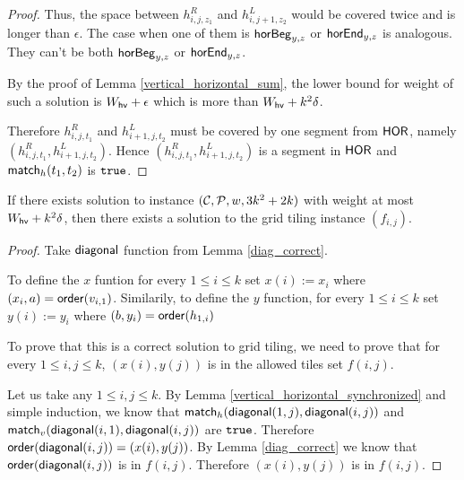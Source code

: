 \begin{proof}
Thus, the space between $h^R_{i,j,z_1}$ and $h^L_{i,j+1,z_2}$
would be covered twice and is longer than $\epsilon$.
The case when one of them is $\mathsf{horBeg}_{y,z}$ or $\mathsf{horEnd}_{y,z}$ is analogous.
They can't be both $\mathsf{horBeg}_{y,z}$ or $\mathsf{horEnd}_{y,z}$.

By the proof of Lemma \ref{vertical_horizontal_sum},
the lower bound for weight of such a solution is $W_{\mathsf{hv}} + \epsilon$
which is more than $W_{\mathsf{hv}}+k^2\delta$.

Therefore $h^R_{i,j,t_1}$ and $h^L_{i+1,j,t_2}$ must be covered
by one segment from $\mathsf{HOR}$, namely $(h^R_{i,j,t_1}, h^L_{i+1,j,t_2})$.
Hence $(h^R_{i,j,t_1}, h^L_{i+1,j,t_2})$ is a segment in $\mathsf{HOR}$
and $\mathsf{match}_h(t_1,t_2)$ is $\texttt{true}$.
\end{proof}


\begin{lemma}
\label{grid_tiling_exists}
	If there exists solution to instance $(\mathcal{C}, \mathcal{P}, w, 3k^2+2k)$
	with weight at most $W_{\mathsf{hv}}+k^2\delta$,
	then there exists a solution to the grid tiling instance $(f_{i,j})$.
\end{lemma}

\begin{proof}
Take $\mathsf{diagonal}$ function from Lemma \ref{diag_correct}.

To define the $x$ funtion 
for every $1 \le i \le k$ set $x(i) := x_i$
where $(x_i, a) = \mathsf{order}(v_{i,1})$.
Similarily, to define the $y$ function,
for every $1 \le i \le k$ set $y(i) := y_i$
where $(b, y_i) = \mathsf{order}(h_{1,i})$

To prove that this is a correct solution to grid tiling,
we need to prove that 
for every $1 \le i,j \le k$, $(x(i), y(j))$ is in
the allowed tiles set $f(i,j)$.

Let us take any $1 \le i,j \le k$.
By Lemma \ref{vertical_horizontal_synchronized}
and simple induction,
we know that $\mathsf{match}_h(\mathsf{diagonal}(1, j),\mathsf{diagonal}(i, j))$ and
$\mathsf{match}_v(\mathsf{diagonal}(i, 1),\mathsf{diagonal}(i, j))$ are $\texttt{true}$.
Therefore $\mathsf{order}(\mathsf{diagonal}(i,j)) = (x(i), y(j))$.
By Lemma \ref{diag_correct} we know that 
$\mathsf{order}(\mathsf{diagonal}(i,j))$ is in $f(i,j)$.
Therefore 
$(x(i), y(j))$
is in $f(i,j)$.
\end{proof}

